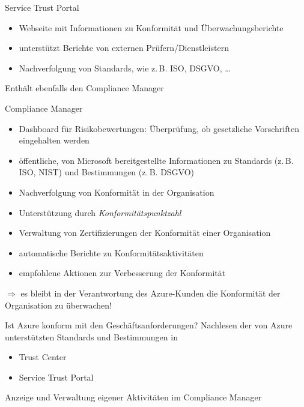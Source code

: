 \begin{flashcard}[Definition]{Service Trust Portal}
    \begin{itemize}
        \item Webseite mit Informationen zu Konformität und Überwachungsberichte
        \item unterstützt Berichte von externen Prüfern/Dienstleistern
        \item Nachverfolgung von Standards, wie z.\,B. ISO, DSGVO, \ldots
    \end{itemize}
    
    \vspace{5mm}
    Enthält ebenfalls den Compliance Manager
\end{flashcard}

\begin{flashcard}[Describe]{Compliance Manager}
    \begin{itemize}
        \item Dashboard für Risikobewertungen:\newline
        Überprüfung, ob gesetzliche Vorschriften eingehalten werden
        \item öffentliche, von Microsoft bereitgestellte Informationen zu Standards (z.\,B. ISO, NIST) und Bestimmungen (z.\,B. DSGVO)
        \item Nachverfolgung von Konformität in der Organisation
        \item Unterstützung durch \emph{Konformitätspunktzahl}
        \item Verwaltung von Zertifizierungen der Konformität einer Organisation
        \item automatische Berichte zu Konformitätsaktivitäten
        \item empfohlene Aktionen zur Verbesserung der Konformität
    \end{itemize}
    
    $\Rightarrow$ es bleibt in der Verantwortung des Azure-Kunden die Konformität der Organisation zu überwachen!
\end{flashcard}

\begin{flashcard}[]{Ist Azure konform mit den Geschäftsanforderungen?}
    Nachlesen der von Azure unterstützten Standards und Bestimmungen in
    \begin{itemize}
        \item Trust Center
        \item Service Trust Portal
    \end{itemize}
    
    \vspace{5mm}
    Anzeige und Verwaltung eigener Aktivitäten im Compliance Manager
\end{flashcard}

